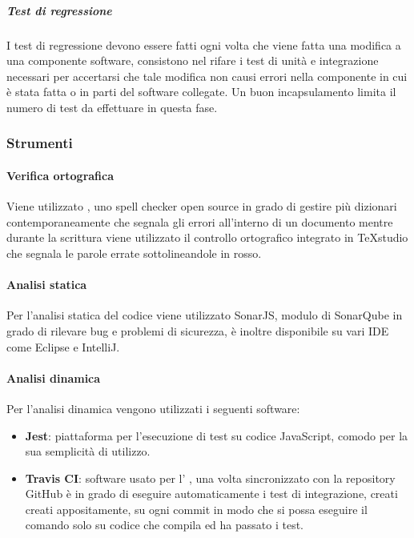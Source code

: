 \subparagraph{Test di regressione}	\Spazio
I test di regressione devono essere fatti ogni volta che viene fatta una modifica a una componente software, consistono nel rifare i test di unità e integrazione necessari per accertarsi che tale modifica non causi errori nella componente in cui è stata fatta o in parti del software collegate.
Un buon incapsulamento limita il numero di test da effettuare in questa fase.
\subsubsection{Strumenti}
\paragraph{Verifica ortografica} \Spazio
Viene utilizzato , uno spell checker open source in grado di gestire più dizionari contemporaneamente che segnala gli errori all'interno di un documento mentre durante la scrittura viene utilizzato il controllo ortografico integrato in TeXstudio che segnala le parole errate sottolineandole in rosso.
\paragraph{Analisi statica} \Spazio
Per l'analisi statica del codice  viene utilizzato SonarJS, modulo di SonarQube in grado di rilevare bug e problemi di sicurezza, è inoltre disponibile su vari IDE come Eclipse e IntelliJ.
\paragraph{Analisi dinamica} \Spazio
Per l'analisi dinamica vengono utilizzati i seguenti software:
\begin{itemize}
	\item  \textbf{Jest}: piattaforma per l'esecuzione di test su codice JavaScript, comodo per la sua semplicità di utilizzo.
	\item \textbf{Travis CI}: software usato per l' , una volta sincronizzato con la repository GitHub è in grado di eseguire automaticamente i test di integrazione, creati creati appositamente, su ogni commit in modo che si possa eseguire il comando  solo su codice che compila ed ha passato i test.
\end{itemize}
